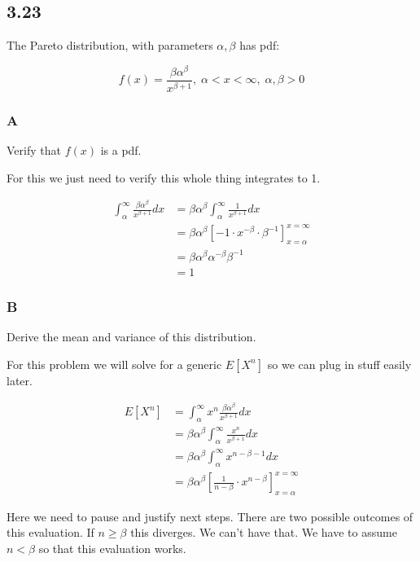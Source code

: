 \subsection*{3.23}

The Pareto distribution, with parameters $\alpha, \beta$ has pdf:

\[
	f(x) = \frac{\beta \alpha^{\beta}}{x^{\beta + 1}}, \; \alpha < x < \infty, \; \alpha, \beta > 0
\]

\subsubsection*{A}

Verify that $f(x)$ is a pdf.

For this we just need to verify this whole thing integrates to 1. 

\begin{align*}
	\int_{\alpha}^{\infty} \frac{\beta \alpha^{\beta}}{x^{\beta + 1}} dx &= \beta \alpha^{\beta} \int_{\alpha}^{\infty} \frac{1}{x^{\beta + 1}} dx \\
	&= \beta \alpha^{\beta} \left[ -1 \cdot x^{-\beta} \cdot \beta^{-1} \right]_{x=\alpha}^{x=\infty} \\
	&= \beta \alpha^{\beta} \alpha^{-\beta} \beta^{-1} \\
	&= 1
\end{align*}

\subsubsection*{B}

Derive the mean and variance of this distribution.

For this problem we will solve for a generic $E[X^n]$ so we can plug in stuff easily later.

\begin{align*}
	E[X^n] &= \int_{\alpha}^{\infty} x^n \frac{\beta \alpha^{\beta}}{x^{\beta + 1}} dx \\
	&= \beta \alpha^{\beta} \int_{\alpha}^{\infty} \frac{x^n}{x^{\beta + 1}} dx \\
	&= \beta \alpha^{\beta} \int_{\alpha}^{\infty} x^{n - \beta - 1} dx \\
	&= \beta \alpha^{\beta} \left[ \frac{1}{n - \beta} \cdot x^{n-\beta} \right]_{x=\alpha}^{x=\infty}
\end{align*}

Here we need to pause and justify next steps. There are two possible outcomes of this evaluation. If $n \geq \beta$ this diverges. We can't have that. We have to assume $n < \beta$ so that this evaluation works. 


